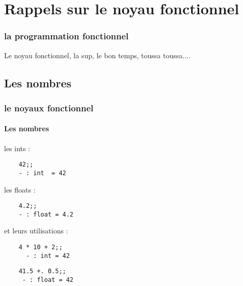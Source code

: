 \section{Rappels sur le noyau fonctionnel}

\begin{frame}
  \begin{center}
    \frametitle{la programmation fonctionnel}
  Le noyau fonctionnel, la sup, le bon temps, toussa toussa....
  \end{center}
\end{frame}

\subsection{Les nombres}
\begin{frame}[fragile]
  \frametitle{le noyaux fonctionnel}
  \framesubtitle{Les nombres}
   \begin{minipage}[t]{5cm}
    les ints : 
    \begin{lstlisting}
    42;;
    - : int  = 42
    \end{lstlisting}
   \end{minipage}
   \begin{minipage}[t]{5cm}
    les floats :
    \begin{lstlisting}
    4.2;;
    - : float = 4.2
    \end{lstlisting}
   \end{minipage}
   \vspace{0.5cm}
    et leurs utilisations :\\
   \begin{minipage}[t]{5cm}
     \begin{lstlisting}
    4 * 10 + 2;;
      - : int = 42
      \end{lstlisting}
   \end{minipage}
   \begin{minipage}[t]{5cm}
     \begin{lstlisting}
    41.5 +. 0.5;;
     - : float = 42
     \end{lstlisting}
   \end{minipage}
\end{frame}

